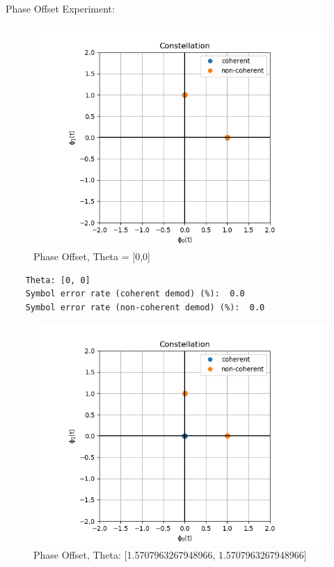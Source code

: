 \documentclass[
	letterpaper, %
	10pt, %
]{CSUniSchoolLabReport}
\begin{document}
Phase Offset Experiment:\newline

\begin{figure}[H] %
	\centering %
	\includegraphics[width=1.2\textwidth]{phase_offset0.png} %
	\caption{Phase Offset, Theta = [0,0]}
	\label{fig:block}
\end{figure}

\begin{lstlisting}
	Theta: [0, 0]
	Symbol error rate (coherent demod) (%):  0.0
	Symbol error rate (non-coherent demod) (%):  0.0
\end{lstlisting}

\begin{figure}[H] %
	\centering %
	\includegraphics[width=1.2\textwidth]{phase_offset1.png} %
	\caption{Phase Offset, Theta: [1.5707963267948966, 1.5707963267948966]}
	\label{fig:block}
\end{figure}
\end{document}
